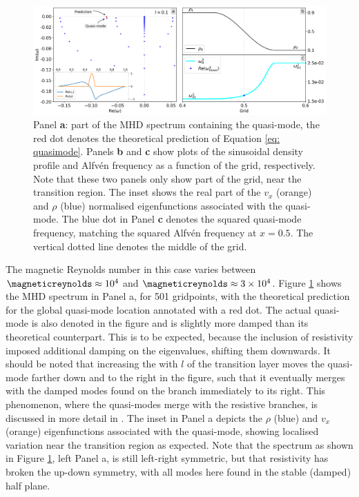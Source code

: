 \begin{figure}[t]
  \centering
  \includegraphics[width=\textwidth]{quasimodes.png}
  \caption{
    Panel \textbf{a}: part of the MHD spectrum containing the quasi-mode, the red dot denotes the theoretical prediction of Equation \eqref{eq: quasimode}. Panels \textbf{b} and \textbf{c} show plots of the sinusoidal density profile and Alfv\'en frequency as a function of the grid, respectively. Note that these two panels only show part of the grid, near the transition region. The inset shows the real part of the $v_x$ (orange) and $\rho$ (blue) normalised eigenfunctions associated with the quasi-mode. The blue dot in Panel \textbf{c} denotes the squared quasi-mode frequency, matching the squared Alfv\'en frequency at $x = 0.5$. The vertical dotted line denotes the middle of the grid.
  }
  \label{fig: quasimodes}
\end{figure}


The magnetic Reynolds number in this case varies between $\magneticreynolds \approx 10^4$ and $\magneticreynolds \approx 3 \times 10^4$. Figure \ref{fig: quasimodes} shows the MHD spectrum in Panel a, for 501 gridpoints, with the theoretical prediction for the global quasi-mode location annotated with a red dot. The actual quasi-mode is also denoted in the figure and is slightly more damped than its theoretical counterpart. This is to be expected, because the inclusion of resistivity imposed additional damping on the eigenvalues, shifting them downwards. It should be noted that increasing the with $l$ of the transition layer moves the quasi-mode farther down and to the right in the figure, such that it eventually merges with the damped modes found on the branch immediately to its right. This phenomenon, where the quasi-modes merge with the resistive branches, is discussed in more detail in \citet{vandoorsselaere2007}. The inset in Panel a depicts the $\rho$ (blue) and $v_x$ (orange) eigenfunctions associated with the quasi-mode, showing localised variation near the transition region as expected. Note that the spectrum as shown in Figure \ref{fig: quasimodes}, left Panel a, is still left-right symmetric, but that resistivity has broken the up-down symmetry, with all modes here found in the stable (damped) half plane.


